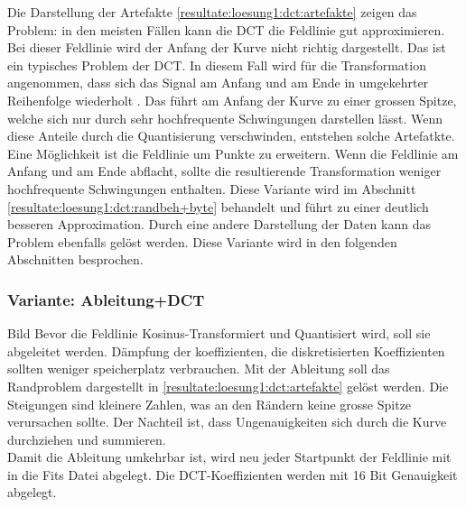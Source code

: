 Die Darstellung der Artefakte \ref{resultate:loesung1:dct:artefakte} zeigen das Problem: in den meisten Fällen kann die DCT die Feldlinie gut approximieren. Bei dieser Feldlinie wird der Anfang der Kurve nicht richtig dargestellt. Das ist ein typisches Problem der DCT. In diesem Fall wird für die Transformation angenommen, dass sich das Signal am Anfang und am Ende in umgekehrter Reihenfolge wiederholt \cite{wiki:dct}. Das führt am Anfang der Kurve zu einer grossen Spitze, welche sich nur durch sehr hochfrequente Schwingungen darstellen lässt.  Wenn diese Anteile durch die Quantisierung verschwinden, entstehen solche Artefatkte.\\
Eine Möglichkeit ist die Feldlinie um Punkte zu erweitern. Wenn die Feldlinie am Anfang und am Ende abflacht, sollte die resultierende Transformation weniger hochfrequente Schwingungen enthalten. Diese Variante wird im Abschnitt \ref{resultate:loesung1:dct:randbeh+byte} behandelt und führt zu einer deutlich besseren Approximation. Durch eine andere Darstellung der Daten kann das Problem ebenfalls gelöst werden. Diese Variante wird in den folgenden Abschnitten besprochen.

\subsubsection{Variante: Ableitung+DCT}\label{resultate:dct:ableitung_dct}
Bild
Bevor die Feldlinie Kosinus-Transformiert und Quantisiert wird, soll sie abgeleitet werden. Dämpfung der koeffizienten, die diskretisierten Koeffizienten sollten weniger speicherplatz verbrauchen. Mit der Ableitung soll das Randproblem dargestellt in \ref{resultate:loesung1:dct:artefakte} gelöst werden. Die Steigungen sind kleinere Zahlen, was an den Rändern keine grosse Spitze verursachen sollte. Der Nachteil ist, dass Ungenauigkeiten sich durch die Kurve durchziehen und summieren.\\
Damit die Ableitung umkehrbar ist, wird neu jeder Startpunkt der Feldlinie mit in die Fits Datei abgelegt. Die DCT-Koeffizienten werden mit 16 Bit Genauigkeit abgelegt.\\

